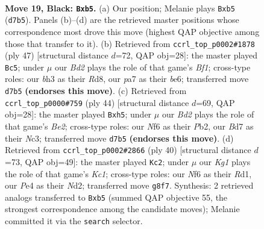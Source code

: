 \documentclass[11pt]{article}
\begin{document}
\clearpage

\begin{figure}[p]\centering
\begin{subfigure}{0.46\textwidth}\centering
\resizebox{\linewidth}{!}{%
\newchessgame
\chessboard[
  setfen={r2r2k1/P1pb2bp/1p3np1/1P3p2/4pP1P/6PB/4P3/RNB2RK1 b - - 0 19},
  showmover=false,
  pgfstyle=straightmove, color=movearrow, markmove={d7-b5}
]}
\caption{}
\end{subfigure}\hfill
\begin{subfigure}{0.46\textwidth}\centering
\resizebox{\linewidth}{!}{%
\newchessgame
\chessboard[
  setfen={1k1rrb2/1bp3pp/1p2Bp2/p2P4/2nNP3/2P3P1/5P1P/2BRR1K1 b - - 9 24},
  showmover=false,
  pgfstyle=straightmove, color=movearrow, markmove={f8-c5}
]}
\caption{}
\end{subfigure}
\\[4pt]
\begin{subfigure}{0.46\textwidth}\centering
\resizebox{\linewidth}{!}{%
\newchessgame
\chessboard[
  setfen={br1r2k1/6b1/p2ppp2/1p5p/4P3/P1N1R1P1/1PP1B1P1/1K1R4 w - - 1 23},
  showmover=false,
  pgfstyle=straightmove, color=movearrow, markmove={e2-h5}
]}
\caption{}
\end{subfigure}\hfill
\begin{subfigure}{0.46\textwidth}\centering
\resizebox{\linewidth}{!}{%
\newchessgame
\chessboard[
  setfen={r3r3/1kp3bp/2b3p1/p1p1pp2/P1P1P3/1P4P1/1B1N1P1P/2KRR3 w - - 1 21},
  showmover=false,
  pgfstyle=straightmove, color=movearrow, markmove={c1-c2}
]}
\caption{}
\end{subfigure}
\caption{\textbf{Move 19, Black: \texttt{Bxb5}.} (a) Our position; Melanie plays \texttt{Bxb5} (\texttt{d7b5}). Panels (b)--(d) are the retrieved master positions whose correspondence most drove this move (highest QAP objective among those that transfer to it). (b) Retrieved from \texttt{ccrl\_top\_p0002\#1878} (ply 47) [structural distance $d$=72, QAP obj=28]: the master played \texttt{Bc5}; under $\mu$ our \emph{Bd2} plays the role of that game's \emph{Bf1}; cross-type roles: our \emph{b}h3 as their \emph{R}d8, our \emph{p}a7 as their \emph{b}e6; transferred move \texttt{d7b5} \textbf{(endorses this move)}. (c) Retrieved from \texttt{ccrl\_top\_p0000\#759} (ply 44) [structural distance $d$=69, QAP obj=28]: the master played \texttt{Bxh5}; under $\mu$ our \emph{Bd2} plays the role of that game's \emph{Be2}; cross-type roles: our \emph{N}f6 as their \emph{P}b2, our \emph{B}d7 as their \emph{N}c3; transferred move \texttt{d7b5} \textbf{(endorses this move)}. (d) Retrieved from \texttt{ccrl\_top\_p0002\#2866} (ply 40) [structural distance $d$=73, QAP obj=49]: the master played \texttt{Kc2}; under $\mu$ our \emph{Kg1} plays the role of that game's \emph{Kc1}; cross-type roles: our \emph{N}f6 as their \emph{R}d1, our \emph{P}e4 as their \emph{N}d2; transferred move \texttt{g8f7}. Synthesis: 2 retrieved analogs transferred to \texttt{Bxb5} (summed QAP objective 55, the strongest correspondence among the candidate moves); Melanie committed it via the \texttt{search} selector.}
\label{fig:thought-m37}
\end{figure}
\end{document}
